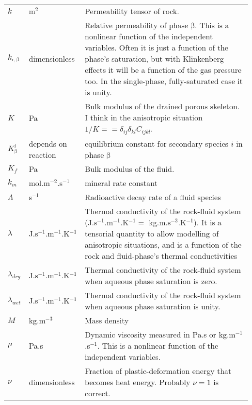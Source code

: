 \documentclass[12pt]{report}
\def\phase{\mathrm{\beta}}
\begin{document}
\begin{longtable}{llp{10cm}}
$k$ & m$^{2}$ & Permeability tensor of rock. \\

$k_{\mathrm{r,}\phase}$ & dimensionless & Relative permeability of phase $\phase$.
This is a nonlinear function of the independent variables.  Often it
is just a function of the phase's saturation, but with Klinkenberg
effects it will be a function of the gas pressure too.  In the
single-phase, fully-saturated case it is unity.  \\

$K$ & Pa & Bulk modulus of the drained porous skeleton.  I think in
the anisotropic situation $1/K = = \delta_{ij}\delta_{kl}C_{ijkl}$. \\

$K_{\phase}^{i}$ & depends on reaction & equilibrium constant for secondary species $i$ in
phase $\phase$ \\

$K_{f}$ & Pa & Bulk modulus of the fluid.  \\

$k_{m}$ & mol.m$^{-2}$.s$^{-1}$ & mineral rate constant \\

$\Lambda$ & s$^{-1}$ & Radioactive decay rate of a fluid species \\

$\lambda$ & J.s$^{-1}$.m$^{-1}$.K$^{-1}$ & Thermal conductivity of
the rock-fluid system (J.s$^{-1}$.m$^{-1}$.K$^{-1} =$
kg.m.s$^{-3}$.K$^{-1}$).  It is a tensorial quantity to allow
modelling of anisotropic situations, and is a function of the
rock and fluid-phase's thermal conductivities\\

$\lambda_{dry}$ & J.s$^{-1}$.m$^{-1}$.K$^{-1}$ & Thermal conductivity of
the rock-fluid system when aqueous phase saturation is zero. \\

$\lambda_{wet}$ & J.s$^{-1}$.m$^{-1}$.K$^{-1}$ & Thermal conductivity of
the rock-fluid system when aqueous phase saturation is unity. \\

$M$ & kg.m$^{-3}$ & Mass density \\

$\mu$ & Pa.s & Dynamic viscosity measured in Pa.s or
kg.m$^{-1}$.s$^{-1}$.  This is a nonlinear function of the independent
variables. \\

$\nu$ & dimensionless & Fraction of plastic-deformation energy that
becomes heat energy.  Probably $\nu=1$ is correct. \\


\end{longtable}
\end{document}
